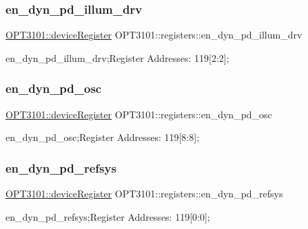 \subsubsection{\texorpdfstring{en\+\_\+dyn\+\_\+pd\+\_\+illum\+\_\+drv}{en\_dyn\_pd\_illum\_drv}}
{\footnotesize\ttfamily \mbox{\hyperlink{class_o_p_t3101_1_1device_register}{O\+P\+T3101\+::device\+Register}} O\+P\+T3101\+::registers\+::en\+\_\+dyn\+\_\+pd\+\_\+illum\+\_\+drv}



en\+\_\+dyn\+\_\+pd\+\_\+illum\+\_\+drv;Register Addresses\+: 119\mbox{[}2\+:2\mbox{]}; 

\mbox{\label{class_o_p_t3101_1_1registers_a531bbd358fefe3feca48a12938b7ef11}} 
\subsubsection{\texorpdfstring{en\+\_\+dyn\+\_\+pd\+\_\+osc}{en\_dyn\_pd\_osc}}
{\footnotesize\ttfamily \mbox{\hyperlink{class_o_p_t3101_1_1device_register}{O\+P\+T3101\+::device\+Register}} O\+P\+T3101\+::registers\+::en\+\_\+dyn\+\_\+pd\+\_\+osc}



en\+\_\+dyn\+\_\+pd\+\_\+osc;Register Addresses\+: 119\mbox{[}8\+:8\mbox{]}; 

\mbox{\label{class_o_p_t3101_1_1registers_ab81d9bb9c0d94666f5d526a379539047}} 
\subsubsection{\texorpdfstring{en\+\_\+dyn\+\_\+pd\+\_\+refsys}{en\_dyn\_pd\_refsys}}
{\footnotesize\ttfamily \mbox{\hyperlink{class_o_p_t3101_1_1device_register}{O\+P\+T3101\+::device\+Register}} O\+P\+T3101\+::registers\+::en\+\_\+dyn\+\_\+pd\+\_\+refsys}



en\+\_\+dyn\+\_\+pd\+\_\+refsys;Register Addresses\+: 119\mbox{[}0\+:0\mbox{]}; 

